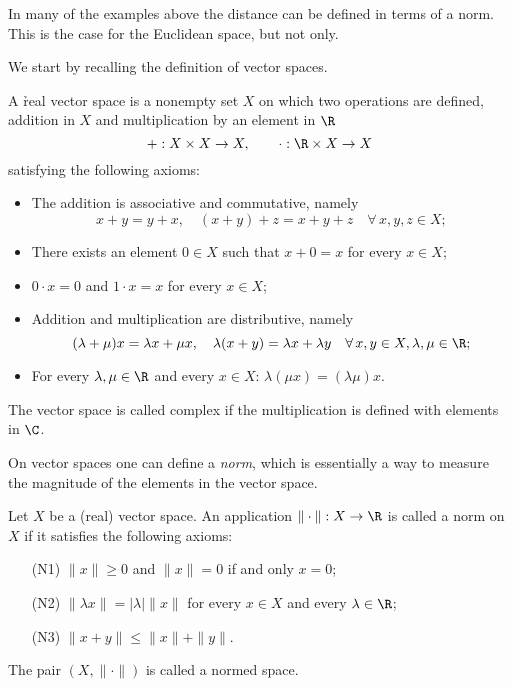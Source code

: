 In many of the examples above the distance can be defined in terms of a norm. This is the case for the Euclidean space, but not only. 


We start by recalling the definition of vector spaces.
\begin{definition}
A \h{real vector space} is a nonempty set $X$ on which two operations are defined, addition in $X$ 
and multiplication by an element in $\R$ 
\slinc{}{\vspace*{-1ex}}
$$
+ : X\times X \to X
,\qquad
\cdot : \R\times X \to X
$$
satisfying the following axioms:
%
\begin{itemize}
\item The addition is associative and commutative, namely
\slinc{}{\vspace*{-1ex}}
$$
x+y = y+x, \quad (x+y)+z = x+y+z \quad \forall \, x,y,z \in X;
$$
\item There exists an element $0\in X$ such that $x+0=x$ for every $x\in X$;
\item $0\cdot x = 0$ and $1\cdot x= x$ for every $x\in X$;
\item Addition and multiplication are distributive, namely
\slinc{}{\vspace*{-1ex}}
$$
(\lambda+\mu)x = \lambda x+ \mu x, \quad \lambda(x+y) = \lambda x+ \lambda y \quad \forall \, x,y \in X, \lambda,\mu\in \R;
$$
\item For every $\lambda, \mu \in \R$ and every $x\in X$:
$
\lambda(\mu x) = (\lambda \mu) x.
$
\end{itemize}
\end{definition}

The vector space is called complex if the multiplication is defined with elements in $\C$.

On vector spaces one can define a \emph{norm}, which is essentially a way to measure the magnitude of the elements in the vector space.


\begin{definition}
Let $X$ be a (real) vector space. An application $\|\cdot\|: X\to \R$ is called a norm on $X$ if it satisfies the following axioms:
\begin{itemize}
\item[(N1)] $\|x\|\geq0$ and $\|x\|=0$ if and only $x=0$;
\item[(N2)] $\|\lambda x\| = |\lambda| \|x\|$ for every $x\in X$ and every $\lambda\in \R$;
\item[(N3)] $\|x+y\|\leq \|x\| + \|y\|$.
\end{itemize}
The pair $(X,\|\cdot\|)$ is called a normed space. 
\end{definition}

